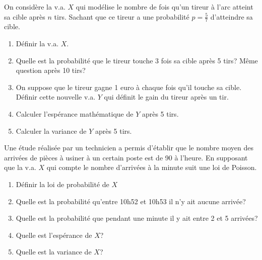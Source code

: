 \documentclass[a4paper]{article}
\newif\ifcorrection
\begin{document}
\exost On consid\`ere la v.a. $X$ qui mod\'elise le nombre de fois qu'un tireur \`a l'arc
atteint sa cible apr\`es $n$ tirs. Sachant que ce tireur a une probabilit\'e $p=\frac{5}{7}$ d'atteindre sa cible.
\begin{enumerate}
 \item D\'efinir la v.a. $X$.
  \ifcorrection
 \textcolor{red}{~\\
 $X: \Omega \rightarrow \{0,1,2,...,n\}$\\
 $X \sim \beta(n,p)$ avec $p=\frac{5}{7}$
 }
 \fi
 \item Quelle est la probabilit\'e que le tireur touche 3 fois sa cible apr\`es 5 tirs? M\^eme question apr\`es 10 tirs?
  \ifcorrection
  \textcolor{red}{~\\
  $X \sim \beta(5,\frac{5}{7}) \Rightarrow P(X=3) = C_5^3 (\frac{5}{7})^3 (\frac{2}{7})^{2}\approx 0,2975$\\
  $X \sim \beta(10,\frac{5}{7}) \Rightarrow P(X=3) = C_{10}^3 (\frac{5}{7})^3 (\frac{2}{7})^{7}\approx 0,0068$
 }
 \fi
 \item On suppose que le tireur gagne 1 euro \`a chaque fois qu'il touche sa cible. D\'efinir cette nouvelle v.a. $Y$ qui 
 d\'efinit le gain du tireur apr\`es un tir.
  \ifcorrection
  \textcolor{red}{~\\
  La nouvelle v.a $Y$ associe un gain de 1 euro \`a chaque fois qu'un tireur touche sa cible donc 
  on a $Y=X$.
  }
  \fi
 \item Calculer l'esp\'erance math\'ematique de $Y$ apr\`es 5 tirs.
   \ifcorrection
  \textcolor{red}{~\\
  $Y$ suit une loi binomiale de param\`etre $p=5/7$ et $n=5$ donc
  $E[Y] = E[X] = np = \frac{25}{7}\approx 3,5714$
  }
  \fi
 \item Calculer la variance de $Y$ apr\`es 5 tirs.
   \ifcorrection
  \textcolor{red}{~\\
  de m\^eme on a $V[Y] = V[X] = n p (1-p) = \frac{5\times 5 \times 2}{7} = 5 \frac{5 \times 2}{7\times 7} = \frac{50}{49} \approx 1,0204$
  }
  \fi
\end{enumerate}



\exost Une \'etude r\'ealis\'ee par un technicien a permis d'\'etablir que le nombre moyen
des arriv\'ees de pi\`eces \`a usiner \`a un certain poste est de 90 \`a l'heure.
En supposant que la v.a. $X$ qui compte le nombre d'arriv\'ees \`a la minute 
suit une loi de Poisson.
\begin{enumerate}
 \item D\'efinir la loi de probabilit\'e de $X$
 \item Quelle est la probabilit\'e qu'entre 10h52 et 10h53 il n'y ait aucune arriv\'ee?
 \item Quelle est la probabilit\'e que pendant une minute il y ait entre 2 et 5 arriv\'ees?
 \item Quelle est l'esp\'erance de $X$?
 \item Quelle est la variance de $X$?
\end{enumerate}
\end{document}
